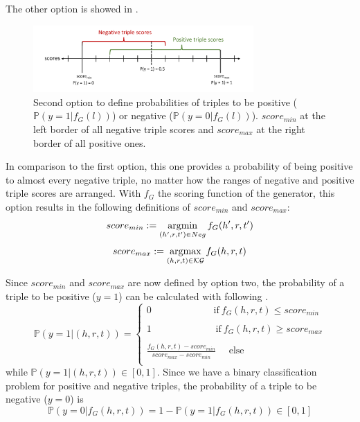 The other option is showed in .
\begin{figure}[t]
  \centering
    \includegraphics[width=0.75\textwidth]{figures/positives_negatives2.pdf}
  \caption{Second option to define probabilities of triples to be positive ($\mathds{P}(y = 1 | f_G(l))$) or negative ($\mathds{P}(y = 0 | f_G(l))$). 
  $score_{min}$ at the left border of all negative triple scores and $score_{max}$ at the right border of all positive ones.}
  \label{fig:positives_negatives2}
\end{figure}
In comparison to the first option, this one provides a probability of being positive to almost every negative triple,
no matter how the ranges of negative and positive triple scores are arranged.
With $f_G$ the scoring function of the generator, this option results in the following definitions of $score_{min}$ and $score_{max}$:
\begin{equation} \label{eqn:opt1_score_min}
    score_{min} := \operatorname*{argmin}_{(h',r,t') \in Neg}{f_G(h',r,t')}
\end{equation}
\begin{equation} \label{eqn:opt1_score_max}
    score_{max} := \operatorname*{argmax}_{(h,r,t) \in \mathcal{KG}}{f_G(h,r,t)}
\end{equation}

Since $score_{min}$ and $score_{max}$ are now defined by option two, the probability of a triple to be positive ($y = 1$) can be calculated with following .
\begin{equation}  \label{eqn:positive_probability}
    \mathds{P}(y = 1|(h, r, t)) =
    \begin{cases}
        0 \ \ \ \ \ \ \ \ \ \ \ \ \ \ \ \ \ \ \ \ \ \ \ \ \ \ \  \ \   
         \text{if} \  f_G(h,r,t) \leq score_{min}
         
        \\ \\
        1 \ \ \ \ \ \ \ \ \ \ \ \ \ \ \ \ \ \ \ \ \ \ \ \ \ \ \   \ \ \
        \text{if} \ f_G(h,r,t) \geq score_{max}
         
        \\ \\
        \frac{f_G(h,r,t) - score_{min}}{score_{max} - score_{min}}
        \ \ \ \ \ \ 
         \text{else}
        \\
    \end{cases} 
\end{equation}
while $\mathds{P}(y = 1|(h, r, t))  \in [0, 1]$.
Since we have a binary classification problem for positive and negative triples, the probability of a triple to be negative ($y=0$) is
\begin{equation} \label{eqn:negative_probability}
    \mathds{P}(y = 0 | f_G(h, r, t)) = 1 - \mathds{P}(y = 1| f_G(h, r, t)) \in [0,1]
\end{equation}


